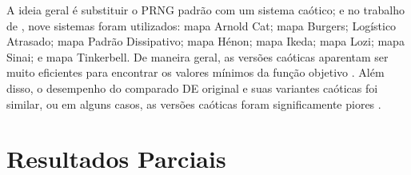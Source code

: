 A ideia geral é substituir o PRNG padrão com um sistema caótico; e no trabalho de \cite{senkerik}, nove sistemas foram utilizados: mapa Arnold Cat; mapa Burgers; Logístico Atrasado; mapa Padrão Dissipativo; mapa Hénon; mapa Ikeda; mapa Lozi; mapa Sinai; e mapa Tinkerbell. De maneira geral, as versões caóticas aparentam ser muito eficientes para encontrar os valores mínimos da função objetivo \cite{senkerik}. Além disso, o desempenho do comparado DE original e suas variantes caóticas foi similar, ou em alguns casos, as versões caóticas foram significamente piores \cite{senkerik}.



\chapter{Resultados Parciais} \label{cap3}
